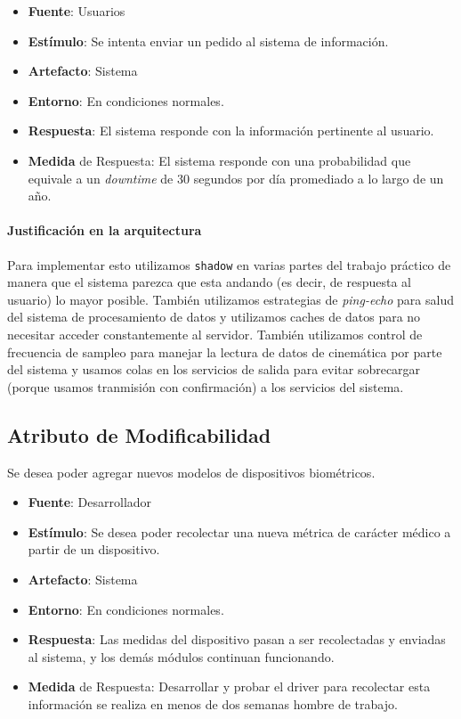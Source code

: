 \begin{itemize}
  \item \textbf{Fuente}: Usuarios
  \item \textbf{Estímulo}: Se intenta enviar un pedido al sistema de información.
  \item \textbf{Artefacto}: Sistema
  \item \textbf{Entorno}: En condiciones normales.
  \item \textbf{Respuesta}: El sistema responde con la información pertinente al usuario.
  \item \textbf{Medida} de Respuesta: El sistema responde con una probabilidad que equivale a un \emph{downtime} de 30 segundos por día promediado a lo largo de un año.
\end{itemize}

\paragraph{Justificación en la arquitectura}

Para implementar esto utilizamos \texttt{shadow} en varias partes del trabajo práctico de manera que el sistema
parezca que esta andando (es decir, de respuesta al usuario) lo mayor posible. También utilizamos estrategias
de \textit{ping-echo} para salud del sistema de procesamiento de datos y utilizamos caches de datos para no 
necesitar acceder constantemente al servidor. También utilizamos control de frecuencia de sampleo para manejar
la lectura de datos de cinemática por parte del sistema y usamos colas en los servicios de salida para evitar
sobrecargar (porque usamos tranmisión con confirmación) a los servicios del sistema.

\subsection{Atributo de Modificabilidad}
Se desea poder agregar nuevos modelos de dispositivos biométricos.

\begin{itemize}
  \item \textbf{Fuente}: Desarrollador
  \item \textbf{Estímulo}: Se desea poder recolectar una nueva métrica de carácter médico a partir de un dispositivo.
  \item \textbf{Artefacto}: Sistema
  \item \textbf{Entorno}: En condiciones normales.
  \item \textbf{Respuesta}: Las medidas del dispositivo pasan a ser recolectadas y enviadas al sistema, y los demás módulos continuan funcionando.
  \item \textbf{Medida} de Respuesta: Desarrollar y probar el driver para recolectar esta información se realiza en menos de dos semanas hombre de trabajo.
\end{itemize}

